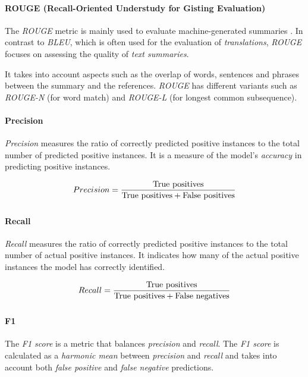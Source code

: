 \documentclass{article}
\begin{document}
\paragraph{ROUGE (Recall-Oriented Understudy for Gisting Evaluation)}
The \textit{ROUGE} metric is mainly used to evaluate machine-generated summaries \cite{ROUGE}. In contrast to \textit{BLEU}, which is often used for the evaluation of \textit{translations}, \textit{ROUGE} focuses on assessing the quality of \textit{text summaries}.

 It takes into account aspects such as the overlap of words, sentences and phrases between the summary and the references. \textit{ROUGE} has different variants such as \textit{ROUGE-N} (for word match) and \textit{ROUGE-L} (for longest common subsequence).

\paragraph{Precision} 
\textit{Precision} measures the ratio of correctly predicted positive instances to the total number of predicted positive instances. It is a measure of the model's \textit{accuracy} in predicting positive instances.

\begin{align}
\begin{split}
	Precision &= \frac{\text{True positives}}{\text{True positives} + \text{False positives}}\\[0.25\baselineskip]
\end{split}
\end{align}

\paragraph{Recall}
\textit{Recall} measures the ratio of correctly predicted positive instances to the total number of actual positive instances. It indicates how many of the actual positive instances the model has correctly identified.

\begin{align}
\begin{split}
	Recall &= \frac{\text{True positives}}{\text{True positives} + \text{False negatives}}\\[0.25\baselineskip]
\end{split}
\end{align}

\paragraph{F1}
The \textit{F1 score} is a metric that balances \textit{precision} and \textit{recall}. The \textit{F1 score} is calculated as a \textit{harmonic mean} between \textit{precision} and \textit{recall} and takes into account both \textit{false positive} and \textit{false negative} predictions.
\end{document}

